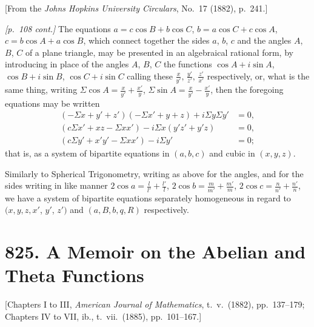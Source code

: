 \documentclass[11pt,a4paper]{article}
\theoremstyle{plain}
\theoremstyle{definition}
\theoremstyle{remark}
\begin{document}
\begin{center}
\small[From the \textit{Johns Hopkins University Circulars}, No.~17 (1882), p.~241.]
\end{center}

\bigskip

\noindent\textit{[p.~108 cont.]} The equations $a = c\cos B + b\cos C$, $b = a\cos C + c\cos A$, $c = b\cos A + a\cos B$, which connect together the sides $a$, $b$, $c$ and the angles $A$, $B$, $C$ of a plane triangle, may be presented in an algebraical rational form, by introducing in place of the angles $A$, $B$, $C$ the functions $\cos A + i\sin A$, $\cos B + i\sin B$, $\cos C + i\sin C$ calling these $\frac{x}{y'},\,\frac{y'}{z'},\,\frac{z'}{x'}$ respectively, or, what is the same thing, writing $\Sigma \cos A = \frac{x}{y'} + \frac{x'}{y}$, $\Sigma \sin A = \frac{x}{y'} - \frac{x'}{y}$, then the foregoing equations may be written
\begin{align*}
(- \Sigma x + y' + z')(- \Sigma x' + y + z) + i\Sigma y\Sigma y' &= 0,\\
(c\Sigma x' + xz - \Sigma x x') - i\Sigma x(y'z' + y'z) &= 0,\\
(c\Sigma y' + x'y' - \Sigma x x') - i\Sigma y' &= 0;
\end{align*}
that is, as a system of bipartite equations in $(a, b, c)$ and cubic in $(x, y, z)$.

Similarly to Spherical Trigonometry, writing as above for the angles, and for the sides writing in like manner $2\cos a = \frac{l}{l'} + \frac{l'}{l}$, $2\cos b = \frac{m}{m'} + \frac{m'}{m}$, $2\cos c = \frac{n}{n'} + \frac{n'}{n}$, we have a system of bipartite equations separately homogeneous in regard to $(x, y, z, x'$, $y'$, $z')$ and $(a, B, b, q, R)$ respectively.

\bigskip

\section*{825. A Memoir on the Abelian and Theta Functions}

\begin{center}
\small[Chapters I to III, \textit{American Journal of Mathematics}, t.\ v.\ (1882), pp.~137--179;\\
Chapters IV to VII, ib., t.\ vii.\ (1885), pp.~101--167.]
\end{center}
\end{document}
